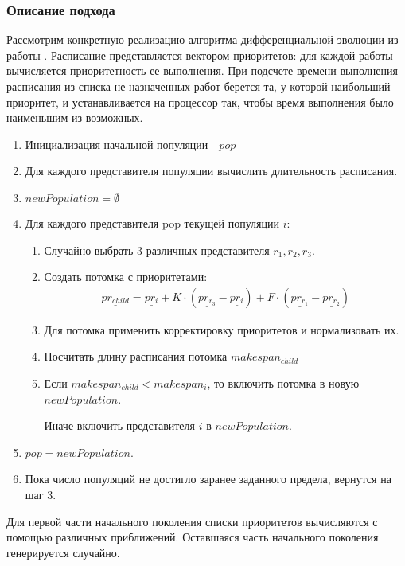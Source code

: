 \documentclass{article}
\begin{document}
\subsubsection{Описание подхода}
Рассмотрим конкретную реализацию алгоритма дифференциальной эволюции из работы \cite{Krzysztof_2005}. Расписание представляется вектором приоритетов: для каждой работы вычисляется приоритетность ее выполнения. При подсчете времени выполнения расписания из списка не назначенных работ берется та, у которой наибольший приоритет, и устанавливается на процессор так, чтобы время выполнения было наименьшим из возможных.
\begin{enumerate}
  \item Инициализация начальной популяции - $pop$
  \item Для каждого представителя популяции вычислить длительность расписания.
  \item $newPopulation = \emptyset$
  \item Для каждого представителя pop текущей популяции $i$:
        \begin{enumerate}
          \item Случайно выбрать $3$ различных представителя $r_1, r_2, r_3$.
          \item Создать потомка с приоритетами:
                \begin{gather*}
                  \underline{pr_{child}} = \underline{pr_i} + K \cdot \left( \underline{pr_{r_3}} - \underline{pr_i} \right) + F \cdot \left( \underline{pr_{r_1}} - \underline{pr_{r_2}} \right)
                \end{gather*}
          \item Для потомка применить корректировку приоритетов и нормализовать их.
          \item Посчитать длину расписания потомка $makespan_{child}$
          \item Если $makespan_{child} < makespan_i$, то включить потомка в новую $newPopulation$. \par
                Иначе включить представителя $i$ в $newPopulation$.
        \end{enumerate}
  \item $pop = newPopulation$.
  \item Пока число популяций не достигло заранее заданного предела, вернутся на шаг 3.
\end{enumerate}
Для первой части начального поколения списки приоритетов вычисляются с помощью различных приближений. Оставшаяся часть начального поколения генерируется случайно. \par
\end{document}
